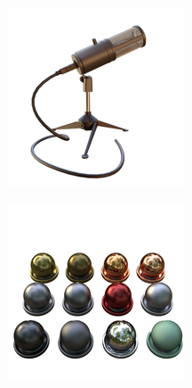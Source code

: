 \documentclass{article}
\begin{document}
\begin{figure}[!h]
\begin{subfigure}{.24\textwidth}
  \centering
  \includegraphics[width=\linewidth]{figs/results/mic_ref.png}  
\end{subfigure}
\begin{subfigure}{.24\textwidth}
  \centering
  \includegraphics[width=\linewidth]{figs/results/materials_ref.png}  

\end{subfigure}
\end{figure}
\end{document}
